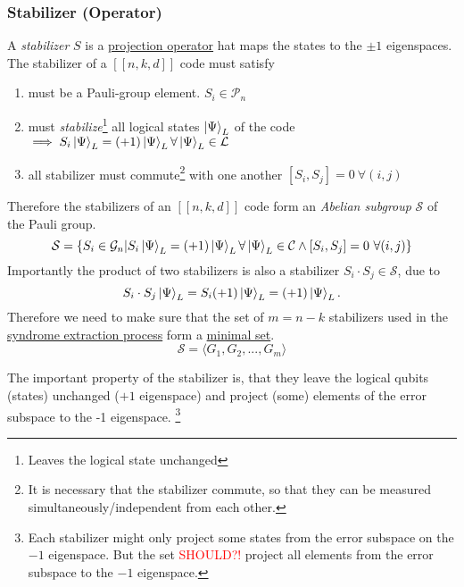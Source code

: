 \subsubsection{Stabilizer (Operator)}
A \textit{stabilizer} 
$S$ is a 
\hyperref[sec:basic.math.projection_operator]{projection operator} 
hat maps the states to the $\pm 1$ eigenspaces. 
The stabilizer of a $[[n,k,d]]$ code must satisfy
\begin{enumerate}
    \item must be a Pauli-group element. $S_i \in \mathcal{P}_n$ 
    \item must \textit{stabilize}\footnote{Leaves the logical state unchanged} all logical states $\ket{\Psi}_L$ of the code \\
    $\implies S_i \ket{\Psi}_L = (+1) \ket{\Psi}_L \forall \ket{\Psi}_L \in \mathcal{L} $ 
    \item all stabilizer must commute\footnote{
It is necessary that the stabilizer commute, so that they can be measured simultaneously/independent from each other. 
    } with one another $[S_i,S_j]=0 \ \forall (i,j)$
\end{enumerate}
Therefore the stabilizers of an $[[n,k,d]]$ code form an \textit{Abelian subgroup} $\mathcal{S}$ of the Pauli group. \cite{QECintro}
\begin{equation}
    \mathcal{S} = \{ S_i \in \mathcal{G}_n | S_i \ket{\Psi}_L = (+1) \ket{\Psi}_L \forall \ket{\Psi}_L\in \mathcal{C} \land [S_i,S_j]=0 \ \forall(i,j)\}
\end{equation}
Importantly the product of two stabilizers is also a stabilizer $S_i \cdot S_j \in \mathcal{S}$, due to
\begin{equation}
    S_i \cdot S_j  \ket{\Psi}_L = S_i (+1) \ket{\Psi}_L = (+1) \ket{\Psi}_L.
\end{equation}
Therefore we need to make sure that the set of $m=n-k$ stabilizers used in the \hyperref[sec:basic.qc.syndrome_extraction_process]{syndrome extraction process}
form a \hyperref[sec:basic.math.minimal_set]{minimal set}. 
\begin{equation}
    \mathcal{S}= \langle G_1, G_2, ..., G_m\rangle
\end{equation}

The important property of the stabilizer is, that they leave the logical qubits (states) unchanged ($+1$ eigenspace) 
and project (some) elements of the error subspace to the -1 eigenspace.
\footnote{
    Each stabilizer might only project some states from the error subspace on the $-1$ eigenspace. 
    But the set \textcolor{red}{SHOULD?!} project all elements from the error subspace to the $-1$ eigenspace. 
} \cite{QECintro}


